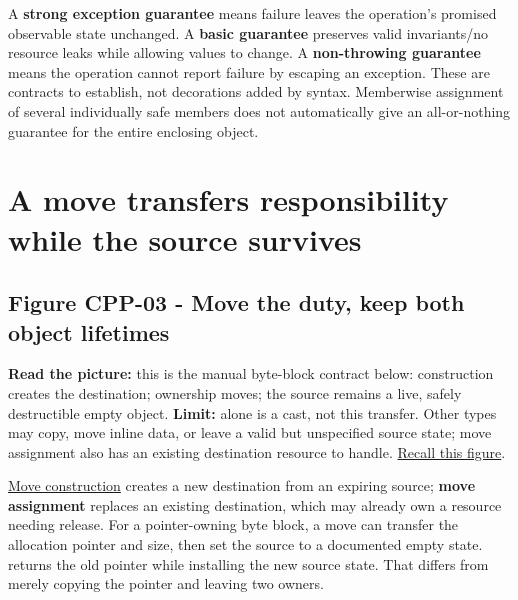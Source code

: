 A \textbf{strong exception guarantee} means failure leaves the operation's promised observable state unchanged. A \textbf{basic guarantee} preserves valid invariants/no resource leaks while allowing values to change. A \textbf{non-throwing guarantee} means the operation cannot report failure by escaping an exception. These are contracts to establish, not decorations added by syntax. Memberwise assignment of several individually safe members does not automatically give an all-or-nothing guarantee for the entire enclosing object.

\section{A move transfers responsibility while the source survives}\label{01-foundations-i-ch003-a-move-transfers-responsibility-while-the-source-survives}

\hypertarget{01-foundations-i-ch003-a-move-transfers-responsibility-while-the-source-survives}{}

\subsection{Figure CPP-03 - Move the duty, keep both object lifetimes}\label{01-foundations-i-ch003-figure-cpp-03---move-the-duty-keep-both-object-lifetimes}

\hypertarget{01-foundations-i-ch003-figure-cpp-03---move-the-duty-keep-both-object-lifetimes}{}


\textbf{Read the picture:} this is the manual byte-block contract below: construction creates the destination; ownership moves; the source remains a live, safely destructible empty object. \textbf{Limit:}  alone is a cast, not this transfer. Other types may copy, move inline data, or leave a valid but unspecified source state; move assignment also has an existing destination resource to handle. \hyperref[appendix-960160274237-four-figure-briefs]{Recall this figure}.

\hyperref[appendix-5636651017c2]{Move construction} creates a new destination from an expiring source; \textbf{move assignment} replaces an existing destination, which may already own a resource needing release. For a pointer-owning byte block, a move can transfer the allocation pointer and size, then set the source to a documented empty state.  returns the old pointer while installing the new source state. That differs from merely copying the pointer and leaving two owners.

